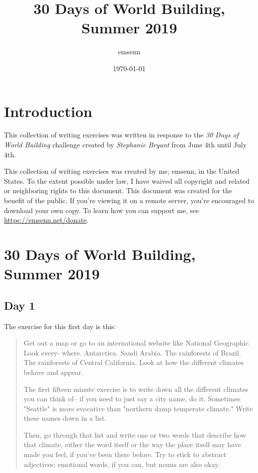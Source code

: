 \documentclass[11pt]{article}
\author{emsenn}
\date{\today}
\title{30 Days of World Building, Summer 2019}
\begin{document}
\maketitle
\section*{Introduction}
\label{sec:org6a18707}
This collection of writing exercises was written in response to the \emph{30 Days of World
Building} challenge created by \emph{Stephanie Bryant} from June 4th until
July 4th.

This collection of writing exercises was created by me, emsenn, in the United States. To the extent possible under law, I have waived all copyright and related or neighboring rights to this document. This document was created for the benefit of the public. If you're viewing it on a remote server, you're encouraged to download your own copy. To learn how you can support me, see \href{https://emsenn.net/donate}{https://emsenn.net/donate}.
\section*{30 Days of World Building, Summer 2019}
\label{sec:org3d2e47d}
\startcontents[level-1]
\subsection*{Day 1}
\label{sec:org617eb65}
The exercise for this first day is this:

\begin{quote}
Get out a map or go to an international website like National
Geographic. Look every- where. Antarctica. Saudi Arabia. The
rainforests of Brazil. The rainforests of Central California. Look
at how the different climates behave and appear.

The first fifteen minute exercise is to write down all the different
climates you can think of-- if you need to just say a city name, do
it. Sometimes "Seattle" is more evocative than "northern damp
temperate climate." Write these names down in a list.

Then, go through that list and write one or two words that describe
how that climate, either the word itself or the way the place itself
may have made you feel, if you've been there before. Try to stick to
abstract adjectives; emotional words, if you can, but nouns are also
okay.
\end{quote}
\end{document}
